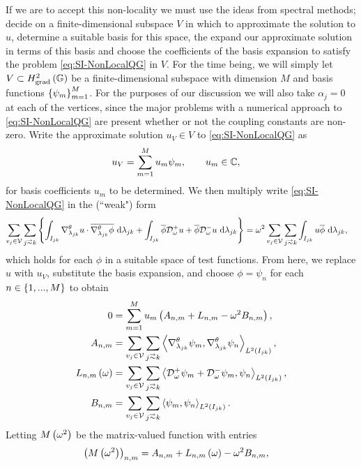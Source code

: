 If we are to accept this non-locality we must use the ideas from spectral methods; decide on a finite-dimensional subspace $V$ in which to approximate the solution to $u$, determine a suitable basis for this space, the expand our approximate solution in terms of this basis and choose the coefficients of the basis expansion to satisfy the problem \eqref{eq:SI-NonLocalQG} in $V$.
For the time being, we will simply let $V\subset H^2_\mathrm{grad}\left( \mathbb{G} \right)$ be a finite-dimensional subspace with dimension $M$ and basis functions $\left\{ \psi_m \right\}_{m=1}^{M}$.
For the purposes of our discussion we will also take $\alpha_j=0$ at each of the vertices, since the major problems with a numerical approach to \eqref{eq:SI-NonLocalQG} are present whether or not the coupling constants are non-zero.
Write the approximate solution $u_V\in V$ to \eqref{eq:SI-NonLocalQG} as
\begin{align*}
	u_V &= \sum_{m=1}^M u_m\psi_m, \qquad u_m\in\mathbb{C},
\end{align*}
for basis coefficients $u_m$ to be determined.
We then multiply write \eqref{eq:SI-NonLocalQG} in the (``weak") form
\begin{align*}
	\sum_{v_j\in\vertSet}\sum_{j\conLeft k} 
	\clbracs{ 
	\integral{I_{jk}}{\tgrad_{\lambda_{jk}}u\cdot\overline{\tgrad_{\lambda_{jk}}\phi}}{\lambda_{jk}} 
	+ \integral{I_{jk}}{\overline{\phi}\dtn^+_{\omega}u + \overline{\phi}\dtn^-_{\omega}u}{\lambda_{jk}} 
	}
	&= \omega^2 \sum_{v_j\in\vertSet}\sum_{j\conLeft k}\integral{I_{jk}}{u\overline{\phi}}{\lambda_{jk}},
\end{align*}
which holds for each $\phi$ in a suitable space of test functions.
From here, we replace $u$ with $u_V$, substitute the basis expansion, and choose $\phi=\psi_n$ for each $n\in\left\{ 1,...,M \right\}$ to obtain
\begin{align*}
	0 &= 
	\sum_{m=1}^{M} u_m \bracs{ A_{n,m} + L_{n,m} - \omega^2 B_{n,m} }, \\
	A_{n,m} &= \sum_{v_j\in\vertSet}\sum_{j\conLeft k} \ip{\tgrad_{\lambda_{jk}}\psi_m}{\tgrad_{\lambda_{jk}}\psi_n}_{L^2\bracs{I_{jk}}}, \\
	L_{n,m}\bracs{\omega} &= \sum_{v_j\in\vertSet}\sum_{j\conLeft k} \ip{\dtn^+_{\omega}\psi_m + \dtn^-_{\omega}\psi_m}{\psi_n}_{L^2\bracs{I_{jk}}}, \\
	B_{n,m} &= \sum_{v_j\in\vertSet}\sum_{j\conLeft k} \ip{\psi_m}{\psi_n}_{L^2\bracs{I_{jk}}}.
\end{align*}
Letting $M\left( \omega^2 \right)$ be the matrix-valued function with entries
\begin{align} \label{eq:SI-NonLocalQGNumericalDisc}
	\left( M\left( \omega^2 \right) \right)_{n,m} &= A_{n,m} + L_{n,m}\left( \omega \right) - \omega^2 B_{n,m},
\end{align}
